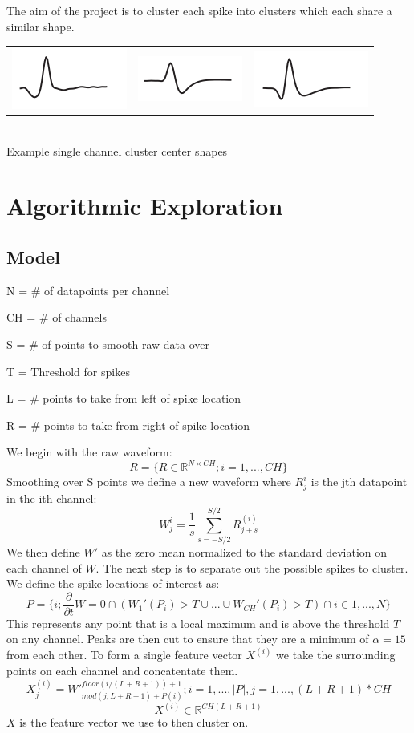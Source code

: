 \documentclass[conference]{IEEEtran}
\begin{document}
The aim of the project is to cluster each spike into clusters
which each share a similar shape. 

\begin{center}
  \begin{tabular}{c c c}
    \includegraphics[width=0.17\linewidth]{WaveShape1.png} &
    \includegraphics[width=0.17\linewidth]{WaveShape2.png} &
    \includegraphics[width=0.17\linewidth]{WaveShape3.png}
  \end{tabular}
  \\
  \small{Example single channel cluster center shapes}
\end{center}

\section{Algorithmic Exploration}
\subsection{Model}

N = \# of datapoints per channel

CH = \# of channels

S = \# of points to smooth raw data over

T = Threshold for spikes

L = \# points to take from left of spike location

R = \# points to take from right of spike location

We begin with the raw waveform:
$$R = \{ {R \in \mathbb{R}^{N \times CH}; i = 1,...,CH} \}$$
Smoothing over S points we define a new waveform where $R^i_j$
is the jth datapoint in the ith channel: 
$$W^i_j = \frac{1}{s}\sum_{s=-S/2}^{S/2}R^{(i)}_{j+s}$$
We then define $W'$ as the zero mean normalized to the standard
deviation on each channel of $W$. The next step is to
separate out the possible spikes to cluster. We define the
spike locations of interest as:
$$P = \{ i; \frac{\partial}{\partial t}W = 0 \cap 
  (W_1'(P_i) > T \cup ... \cup W_{CH}'(P_i) > T) \cap i \in
  1,...,N \} $$
This represents any point that is a local maximum and is above the
threshold $T$ on any channel. Peaks are then cut to ensure that they are a minimum of
$\alpha = 15$ from each other. To form a single feature vector $X^{(i)}$ we take the
 surrounding points on each channel and concatentate them.
 $$X^{(i)}_j = W'^{floor(i/(L+R+1))+1}_{mod(j, L+R+1) + P(i)}
  ; i = 1,...,|P|, j = 1,...,(L+R+1)*CH$$
  $$X^{(i)} \in \mathbb{R}^{CH(L+R+1)}$$
$X$ is the feature vector we use to then cluster on.
\end{document}
